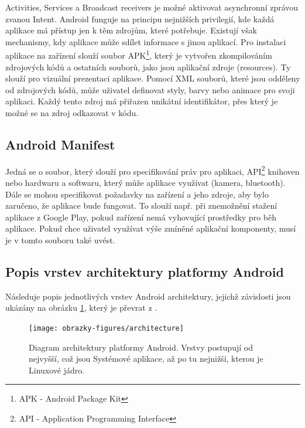 Activities, Services a Broadcast receivers je možné aktivovat asynchronní zprávou zvanou Intent. Android funguje na principu nejnižších privilegií, kde každá aplikace má přístup jen k těm zdrojům, které potřebuje. Existují však mechanismy, kdy aplikace může sdílet informace s jinou aplikací. Pro instalaci aplikace na zařízení slouží soubor APK\footnote{APK - Android Package Kit}, který je vytvořen zkompilováním zdrojových kódů a ostatních souborů, jako jsou aplikační zdroje (resources). Ty slouží pro vizuální prezentaci aplikace. Pomocí XML souborů, které jsou odděleny od zdrojových kódů, může uživatel definovat styly, barvy nebo animace pro svoji aplikaci. Každý tento zdroj má přiřazen unikátní identifikátor, přes který je možné se na zdroj odkazovat v kódu.

\subsection*{Android Manifest}

Jedná se o soubor, který slouží pro specifikování práv pro aplikaci, API\footnote{API - Application Programming Interface} knihoven nebo  hardwaru a softwaru, který může aplikace využívat (kamera, bluetooth). Dále se mohou specifikovat požadavky na zařízení a jeho zdroje, aby bylo zaručeno, že aplikace bude fungovat. To slouží např. při znemožnění stažení aplikace z Google Play, pokud zařízení nemá vyhovující prostředky pro běh aplikace. Pokud chce uživatel využívat výše zmíněné aplikační komponenty, musí je v tomto souboru také uvést.
 
\subsection*{Popis vrstev architektury platformy Android}

Následuje popis jednotlivých vrstev Android architektury, jejichž závislosti jsou ukázány na obrázku \ref{archi}, který je převrat z \cite{android}.

\begin{figure}[t]
\centering
\texttt{[image: obrazky-figures/architecture]}
\caption{Diagram architektury platformy Android. Vrstvy postupují od nejvyšší, což jsou Systémové aplikace, až po tu nejnižší, kterou je Linuxové jádro.}
\label{archi}
\end{figure}

